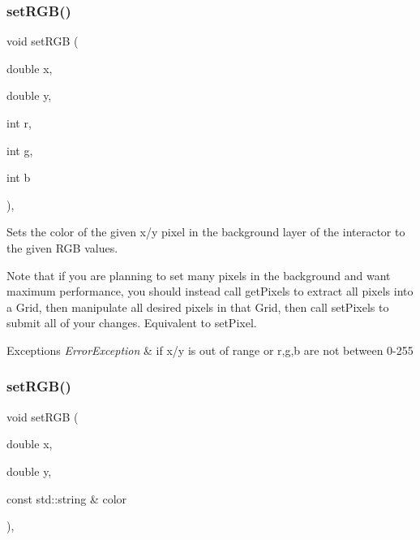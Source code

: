 \subsubsection{\texorpdfstring{set\+R\+G\+B()}{setRGB()}\hspace{0.1cm}{\footnotesize\ttfamily [2/3]}}
{\footnotesize\ttfamily void set\+R\+GB (\begin{DoxyParamCaption}\item[{double}]{x,  }\item[{double}]{y,  }\item[{int}]{r,  }\item[{int}]{g,  }\item[{int}]{b }\end{DoxyParamCaption})\hspace{0.3cm}{\ttfamily [virtual]}, {\ttfamily [inherited]}}



Sets the color of the given x/y pixel in the background layer of the interactor to the given R\+GB values. 

Note that if you are planning to set many pixels in the background and want maximum performance, you should instead call get\+Pixels to extract all pixels into a Grid, then manipulate all desired pixels in that Grid, then call set\+Pixels to submit all of your changes. Equivalent to set\+Pixel.


\begin{DoxyExceptions}{Exceptions}
{\em Error\+Exception} & if x/y is out of range or r,g,b are not between 0-\/255 \\
\hline
\end{DoxyExceptions}
\mbox{\label{classGDrawingSurface_ae9a228792d4bb4b628350f39eaa3ad12}} 
\subsubsection{\texorpdfstring{set\+R\+G\+B()}{setRGB()}\hspace{0.1cm}{\footnotesize\ttfamily [3/3]}}
{\footnotesize\ttfamily void set\+R\+GB (\begin{DoxyParamCaption}\item[{double}]{x,  }\item[{double}]{y,  }\item[{const std\+::string \&}]{color }\end{DoxyParamCaption})\hspace{0.3cm}{\ttfamily [virtual]}, {\ttfamily [inherited]}}



